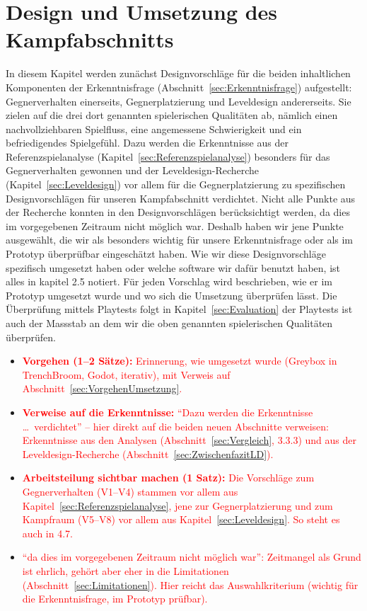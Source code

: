 \documentclass[../Main.tex]{subfiles}
\begin{document}
\section{Design und Umsetzung des Kampfabschnitts} \label{sec:Umsetzung}

In diesem Kapitel werden zunächst Designvorschläge für die beiden inhaltlichen Komponenten der Erkenntnisfrage (Abschnitt~\ref{sec:Erkenntnisfrage}) aufgestellt: Gegnerverhalten einerseits, Gegnerplatzierung und Leveldesign andererseits. Sie zielen auf die drei dort genannten spielerischen Qualitäten ab, nämlich einen nachvollziehbaren Spielfluss, eine angemessene Schwierigkeit und ein befriedigendes Spielgefühl. Dazu werden die Erkenntnisse aus der Referenzspielanalyse (Kapitel~\ref{sec:Referenzspielanalyse}) besonders für das Gegnerverhalten gewonnen und der Leveldesign-Recherche (Kapitel~\ref{sec:Leveldesign}) vor allem für die Gegnerplatzierung zu spezifischen Designvorschlägen für unseren Kampfabschnitt verdichtet. Nicht alle Punkte aus der Recherche konnten in den Designvorschlägen berücksichtigt werden, da dies im vorgegebenen Zeitraum nicht möglich war. Deshalb haben wir jene Punkte ausgewählt, die wir als besonders wichtig für unsere Erkenntnisfrage oder als im Prototyp überprüfbar eingeschätzt haben. Wie wir diese Designvorschläge spezifisch umgesetzt haben oder welche software wir dafür benutzt haben, ist alles in kapitel 2.5 notiert. Für jeden Vorschlag wird beschrieben, wie er im Prototyp umgesetzt wurde und wo sich die Umsetzung überprüfen lässt. Die Überprüfung mittels Playtests folgt in Kapitel~\ref{sec:Evaluation} der Playtests ist auch der Massstab an dem wir die oben genannten spielerischen Qualitäten überprüfen.

\begin{itemize}[leftmargin=1.5cm]
    \item \textcolor{red}{\textbf{Vorgehen (1--2 Sätze):} Erinnerung, wie umgesetzt wurde (Greybox in TrenchBroom, Godot, iterativ), mit Verweis auf Abschnitt~\ref{sec:VorgehenUmsetzung}.}
    \item \textcolor{red}{\textbf{Verweise auf die Erkenntnisse:} \enquote{Dazu werden die Erkenntnisse \ldots\ verdichtet} -- hier direkt auf die beiden neuen Abschnitte verweisen: Erkenntnisse aus den Analysen (Abschnitt~\ref{sec:Vergleich}, 3.3.3) und aus der Leveldesign-Recherche (Abschnitt~\ref{sec:ZwischenfazitLD}).}
    \item \textcolor{red}{\textbf{Arbeitsteilung sichtbar machen (1 Satz):} Die Vorschläge zum Gegnerverhalten (V1--V4) stammen vor allem aus Kapitel~\ref{sec:Referenzspielanalyse}, jene zur Gegnerplatzierung und zum Kampfraum (V5--V8) vor allem aus Kapitel~\ref{sec:Leveldesign}. So steht es auch in 4.7.}
    \item \textcolor{red}{\enquote{da dies im vorgegebenen Zeitraum nicht möglich war}: Zeitmangel als Grund ist ehrlich, gehört aber eher in die Limitationen (Abschnitt~\ref{sec:Limitationen}). Hier reicht das Auswahlkriterium (wichtig für die Erkenntnisfrage, im Prototyp prüfbar).}
\end{itemize}
\end{document}
